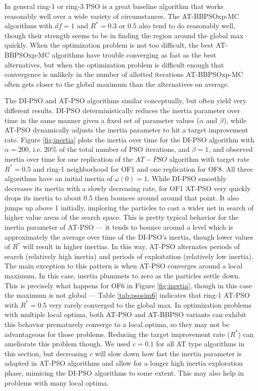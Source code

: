\documentclass[12pt]{article}
\begin{document}
In general ring-1 or ring-3 PSO is a great baseline algorithm that works reasonably well over a wide variety of circumstances. The AT-BBPSOxp-MC algorithms with $df=1$ and $R^*=0.3$ or $0.5$ also tend to do reasonably well, though their strength seems to be in finding the region around the global max quickly. When the optimization problem is not too difficult, the best AT-BBPSOxp-MC algorithms have trouble converging as fast as the best alternatives, but when the optimization problem is difficult enough that convergence is unlikely in the number of allotted iterations AT-BBPSOxp-MC often gets closer to the global maximum than the alternatives on average.

The DI-PSO and AT-PSO algorithms similar conceptually, but often yield very different results. DI-PSO deterministically reduces the inertia parameter over time in the same manner given a fixed set of parameter values ($\alpha$ and $\beta$), while AT-PSO dynamically adjusts the inertia parameter to hit a target improvement rate. Figure \ref{fig:inertia} plots the inertia over time for the DI-PSO algorithm with $\alpha=200$, i.e. 20\% of the total number of PSO iterations, and $\beta=1$, and observed inertia over time for one replication of the $AT-PSO$ algorithm with target rate $R^*=0.5$ and ring-1 neighborhood for OF1 and one replication for OF8. All three algorithms have an initial inertia of $\omega(0)=1$. While DI-PSO smoothly decreases its inertia with a slowly decreasing rate, for OF1 AT-PSO very quickly drops its inertia to about 0.5 then bounces around around that point. It also jumps up above 1 initially, imploring the particles to cast a wider net in search of higher value areas of the search space. This is pretty typical behavior for the inertia parameter of AT-PSO --- it tends to bounce around a level which is approximately the average over time of the DI-PSO's inertia, though lower values of $R^*$ will result in higher inertias. In this way, AT-PSO alternates periods of search (relatively high inertia) and periods of exploitation (relatively low inertia). The main exception to this pattern is when AT-PSO converges around a local maximum. In this case, inertia plummets to zero as the particles settle down. This is precisely what happens for OF6 in Figure \ref{fig:inertia}, though in this case the maximum is not global --- Table \ref{tab:psosim6} indicates that ring-1 AT-PSO with $R^*=0.5$ very rarely converged to the global max. In optimization problems with multiple local optima, both AT-PSO and AT-BBPSO variants can exhibit this behavior prematurely converge to a local optima, so they may not be advantageous for those problems. Reducing the target improvement rate ($R^*$) can ameliorate this problem though. We used $c=0.1$ for all AT type algorithms in this section, but decreasing $c$ will slow down how fast the inertia parameter is adapted in AT-PSO algorithms and allow for a longer high inertia exploration phase, mimicing the DI-PSO algorithms to some extent. This may also help in problems with many local optima.
\end{document}
